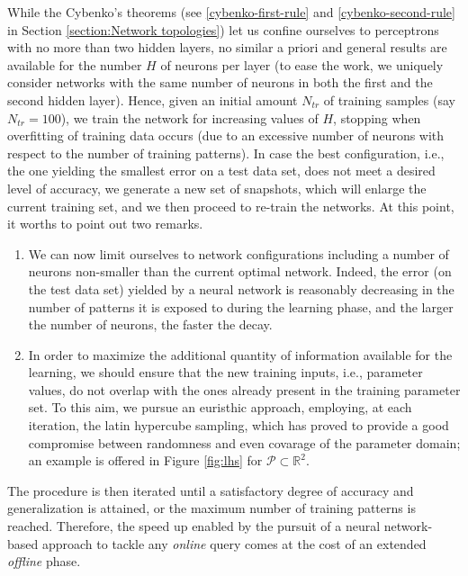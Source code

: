 \documentclass[12pt, a4paper, twoside, openright]{report}
\numberwithin{equation}{chapter}
\theoremstyle{theorem}
\theoremstyle{definition}
\theoremstyle{remark}
\theoremstyle{proposition}
\numberwithin{figure}{chapter}
\begin{document}
		While the Cybenko's theorems (see \ref{cybenko-first-rule} and \ref{cybenko-second-rule} in Section \ref{section:Network topologies}) let us confine ourselves to perceptrons with no more than two hidden layers, no similar a priori and general results are available for the number $H$ of neurons per layer (to ease the work, we uniquely consider networks with the same number of neurons in both the first and the second hidden layer). Hence, given an initial amount $N_{tr}$ of training samples (say $N_{tr} = 100$), we train the network for increasing values of $H$, stopping when overfitting of training data occurs (due to an excessive number of neurons with respect to the number of training patterns). In case the best configuration, i.e., the one yielding the smallest error on a test data set, does not meet a desired level of accuracy, we generate a new set of snapshots, which will enlarge the current training set, and we then proceed to re-train the networks. At this point, it worths to point out two remarks. 
		\begin{enumerate}[label=(\roman*)]
			\vspace*{-0.1cm}
			\item We can now limit ourselves to network configurations including a number of neurons non-smaller than the current optimal network. Indeed, the error (on the test data set) yielded by a neural network is reasonably decreasing in the number of patterns it is exposed to during the learning phase, and the larger the number of neurons, the faster the decay.
			\vspace*{-0.1cm}
			\item In order to maximize the additional quantity of information available for the learning, we should ensure that the new training inputs, i.e., parameter values, do not overlap with the ones already present in the training parameter set. To this aim, we pursue an euristhic approach, employing, at each iteration, the latin hypercube sampling, which has proved to provide a good compromise between randomness and even covarage of the parameter domain; an example is offered in Figure \ref{fig:lhs} for $\mathcal{P} \subset \mathbb{R}^2$.
		\end{enumerate} 
		The procedure is then iterated until a satisfactory degree of accuracy and generalization is attained, or the maximum number of training patterns is reached. Therefore, the speed up enabled by the pursuit of a neural network-based approach to tackle any \emph{online} query comes at the cost of an extended \emph{offline} phase.
		
\end{document}
